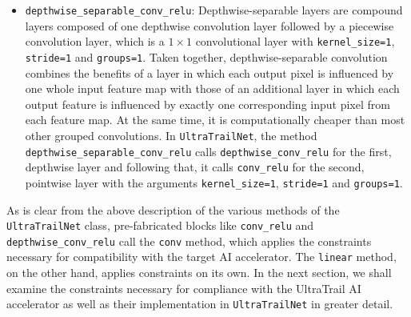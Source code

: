\documentclass[11pt,a4paper, open=any]{scrbook}
\newcounter{constraint}[chapter]
\newenvironment{constraintbox}[2]{%
	\refstepcounter{constraint}%
	\begin{constraintboxbase}{#1}\label{constr:#2}%
	}{%
	\end{constraintboxbase}%
}
\newcommand{\py}[1]{\texttt{#1}}
\begin{document}
\begin{itemize}[
	label={},
	parsep=0pt,
	partopsep=0pt,
	itemsep=16pt
	]
	\begin{constraintbox}{Depthwise Layers}{eq_dw}
		$|\text{channels}_{in}| = |\text{channels}_{out}| = |\text{groups}|$
	\end{constraintbox}	
	
	This constraint is enforced within the dedicated method \py{depthwise_conv_relu} as follows:
	
	\begin{verbatim}
		in_channels = layer_input.shape()[1]
		
		groups = in_channels
		out_channels = in_channels
	\end{verbatim}
	
	After fixing the values of \py{in_channels}, \py{out_channels} and groups, \py{depthwise_conv_relu} calls the \py{_conv}, so that all other constraints that must apply to all convolution layers is applied to the depthwise layer as well.
	
	\item \py{depthwise_separable_conv_relu}: Depthwise-separable layers are compound layers composed of one depthwise convolution layer followed by a piecewise convolution layer, which is a $1\times 1$ convolutional layer with \py{kernel_size=1}, \py{stride=1} and \py{groups=1}. Taken together, depthwise-separable convolution combines the benefits of a layer in which each output pixel is influenced by one whole input feature map with those of an additional layer in which each output feature is influenced by exactly one corresponding input pixel from each feature map. At the same time, it is computationally cheaper than most other grouped convolutions. In \py{UltraTrailNet}, the method \py{depthwise_separable_conv_relu} calls \py{depthwise_conv_relu} for the first, depthwise layer and following that, it calls \py{conv_relu} for the second, pointwise layer with the arguments \py{kernel_size=1}, \py{stride=1} and \py{groups=1}.
\end{itemize}

As is clear from the above description of the various methods of the \py{UltraTrailNet} class, pre-fabricated blocks like \py{conv_relu} and \py{depthwise_conv_relu} call the \py{conv} method, which applies the constraints necessary for compatibility with the target AI accelerator. The \py{linear} method, on the other hand, applies constraints on its own. In the next section, we shall examine the constraints necessary for compliance with the UltraTrail AI accelerator as well as their implementation in \py{UltraTrailNet} in greater detail.
\end{document}
